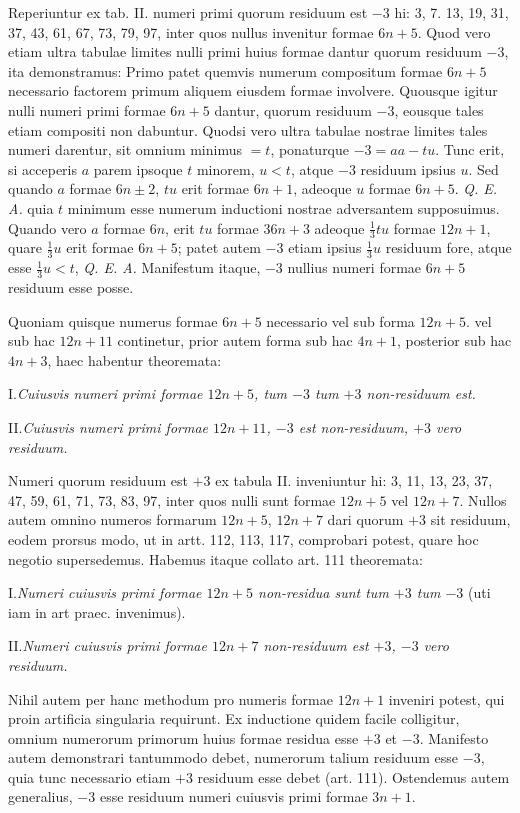 Reperiuntur ex tab. II. numeri primi quorum residuum est $-3$ hi: 3, 7. 13, 19, 31, 37, 43, 61, 67, 73, 79, 97, inter quos nullus invenitur formae $6n+5$. Quod vero etiam ultra tabulae limites nulli primi huius formae dantur quorum residuum $-3$, ita demonstramus: Primo patet quemvis numerum compositum formae $6n+5$ necessario factorem primum aliquem eiusdem formae involvere. Quousque igitur nulli numeri primi formae $6n+5$ dantur, quorum residuum $-3$, eousque tales etiam compositi non dabuntur. Quodsi vero ultra tabulae nostrae limites tales numeri darentur, sit omnium minimus $=t$, ponaturque $-3=aa-tu$. Tunc erit, si acceperis $a$ parem ipsoque $t$ minorem, $u<t$, atque $-3$ residuum ipsius $u$. Sed quando $a$ formae $6n\pm2$, $tu$ erit formae $6n+1$, adeoque $u$ formae $6n+5$. \emph{Q. E. A.} quia $t$ minimum esse numerum inductioni nostrae adversantem supposuimus. Quando vero $a$ formae $6n$, erit $tu$ formae $36n+3$ adeoque $\frac{1}{3}tu$ formae $12n+1$, quare $\frac{1}{3}u$ erit formae $6n+5$; patet autem $-3$ etiam ipsius $\frac{1}{3}u$ residuum fore, atque esse $\frac{1}{3}u<t$, \emph{Q. E. A.} Manifestum itaque, $-3$ nullius numeri formae $6n+5$ residuum esse posse.

Quoniam quisque numerus formae $6n+5$ necessario vel sub forma $12n+5$. vel sub hac $12n+11$ continetur, prior autem forma sub hac $4n+1$, posterior sub hac $4n+3$, haec habentur theoremata:

I.\quad \emph{Cuiusvis numeri primi formae $12n+5$, tum $-3$ tum $+3$ non-residuum est.}

II.\quad \emph{Cuiusvis numeri primi formae $12n+11$, $-3$ est non-residuum, $+3$ vero residuum.}

Numeri quorum residuum est $+3$ ex tabula II. inveniuntur hi: 3, 11, 13, 23, 37, 47, 59, 61, 71, 73, 83, 97, inter quos nulli sunt formae $12n+5$ vel $12n+7$. Nullos autem omnino numeros formarum $12n+5$, $12n+7$ dari quorum $+3$ sit residuum, eodem prorsus modo, ut in artt. 112, 113, 117, comprobari potest, quare hoc negotio supersedemus. Habemus itaque collato art. 111 theoremata:

I.\quad \emph{Numeri cuiusvis primi formae $12n+5$ non-residua sunt tum $+3$ tum $-3$} (uti iam in art praec. invenimus).

II.\quad \emph{Numeri cuiusvis primi formae $12n+7$ non-residuum est $+3$, $-3$ vero residuum.}

Nihil autem per hanc methodum pro numeris formae $12n+1$ inveniri potest, qui proin artificia singularia requirunt. Ex inductione quidem facile colligitur, omnium numerorum primorum huius formae residua esse $+3$ et $-3$. Manifesto autem demonstrari tantummodo debet, numerorum talium residuum esse $-3$, quia tunc necessario etiam $+3$ residuum esse debet (art. 111). Ostendemus autem generalius, $-3$ esse residuum numeri cuiusvis primi formae $3n+1$.

